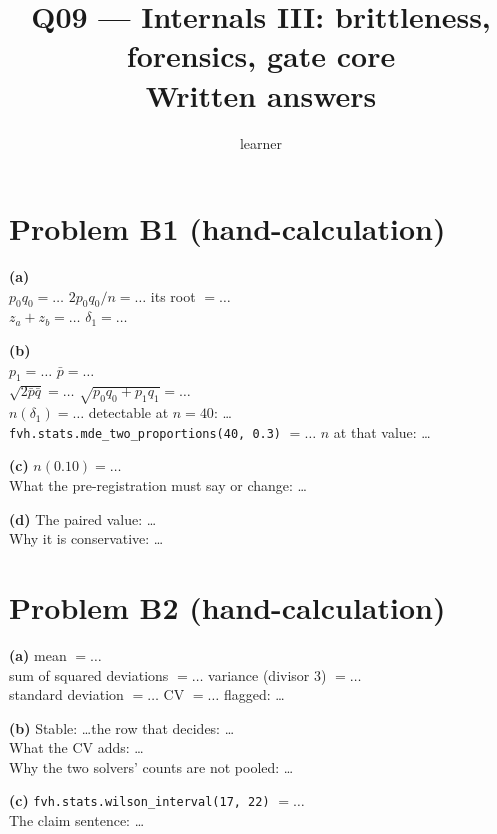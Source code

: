 \documentclass[11pt]{article}
\title{Q09 --- Internals III: brittleness, forensics, gate core \\ \large Written answers}
\author{learner}
\date{}
\begin{document}
\sloppy
\maketitle

\section*{Problem B1 (hand-calculation)}\label{ans:B1}
\begin{answer}
\textbf{(a)} \\
$p_0 q_0 = \dots$ \quad $2 p_0 q_0 / n = \dots$ \quad its root $= \dots$ \\
$z_a + z_b = \dots$ \quad $\delta_1 = \dots$

\textbf{(b)} \\
$p_1 = \dots$ \quad $\bar p = \dots$ \\
$\sqrt{2 \bar p \bar q} = \dots$ \quad $\sqrt{p_0 q_0 + p_1 q_1} = \dots$ \\
$n(\delta_1) = \dots$ \quad detectable at $n = 40$: \dots \\
\texttt{fvh.stats.mde\_two\_proportions(40, 0.3)} $= \dots$ \quad $n$ at that value: \dots

\textbf{(c)} $n(0.10) = \dots$ \\
What the pre-registration must say or change: \dots

\textbf{(d)} The paired value: \dots \\
Why it is conservative: \dots
\end{answer}

\section*{Problem B2 (hand-calculation)}\label{ans:B2}
\begin{answer}
\textbf{(a)} mean $= \dots$ \\
sum of squared deviations $= \dots$ \quad variance (divisor 3) $= \dots$ \\
standard deviation $= \dots$ \quad CV $= \dots$ \quad flagged: \dots

\textbf{(b)} Stable: \dots \quad the row that decides: \dots \\
What the CV adds: \dots \\
Why the two solvers' counts are not pooled: \dots

\textbf{(c)} \texttt{fvh.stats.wilson\_interval(17, 22)} $= \dots$ \\
The claim sentence: \dots
\end{answer}
\end{document}
